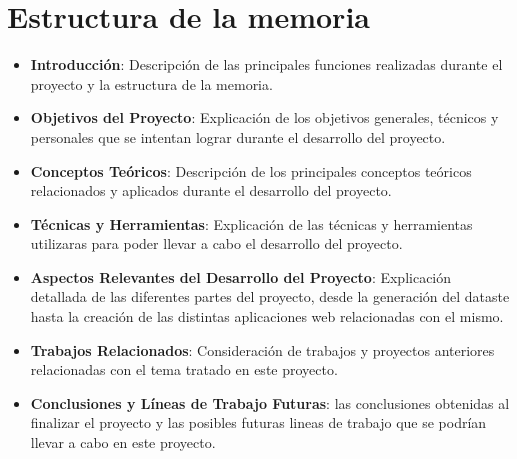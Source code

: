 \section{Estructura de la memoria}
\begin{itemize}
    \item \textbf{Introducción}: Descripción de las principales funciones realizadas durante el proyecto y la estructura de la memoria.
    \item \textbf{Objetivos del Proyecto}: Explicación de los objetivos generales, técnicos y personales que se intentan lograr durante el desarrollo del proyecto.
    \item \textbf{Conceptos Teóricos}: Descripción de los principales conceptos teóricos relacionados y aplicados durante el desarrollo del proyecto.  
    \item \textbf{Técnicas y Herramientas}: Explicación de las técnicas y herramientas utilizaras para poder llevar a cabo el desarrollo del proyecto.
    \item \textbf{Aspectos Relevantes del Desarrollo del Proyecto}: Explicación detallada de las diferentes partes del proyecto, desde la generación del dataste hasta la creación de las distintas aplicaciones web relacionadas con el mismo.
    \item \textbf{Trabajos Relacionados}: Consideración de trabajos y proyectos anteriores relacionadas con el tema tratado en este proyecto.
    \item \textbf{Conclusiones y Líneas de Trabajo Futuras}: las conclusiones obtenidas al finalizar el proyecto y las posibles futuras lineas de trabajo que se podrían llevar a cabo en este proyecto.
\end{itemize}

